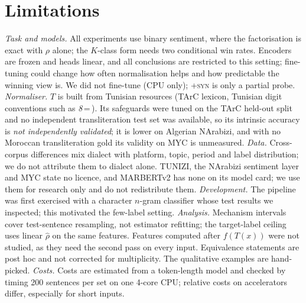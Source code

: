 \section{Limitations}
\label{sec:limitations}
\emph{Task and models.} All experiments use binary sentiment, where the factorisation is exact with $\rho$ alone; the $K$-class form needs two conditional win rates. Encoders are frozen and heads linear, and all conclusions are restricted to this setting; fine-tuning could change how often normalisation helps and how predictable the winning view is. We did not fine-tune (CPU only); \textsc{+syn} is only a partial probe.
\emph{Normaliser.} $T$ is built from Tunisian resources (TArC lexicon, Tunisian digit conventions such as \textit{8}\,=\,). Its safeguards were tuned on the TArC held-out split and no independent transliteration test set was available, so its intrinsic accuracy is \emph{not independently validated}; it is lower on Algerian NArabizi, and with no Moroccan transliteration gold its validity on MYC is unmeasured.
\emph{Data.} Cross-corpus differences mix dialect with platform, topic, period and label distribution; we do not attribute them to dialect alone. TUNIZI, the NArabizi sentiment layer and MYC state no licence, and MARBERTv2 has none on its model card; we use them for research only and do not redistribute them.
\emph{Development.} The pipeline was first exercised with a character $n$-gram classifier whose test results we inspected; this motivated the few-label setting.
\emph{Analysis.} Mechanism intervals cover test-sentence resampling, not estimator refitting; the target-label ceiling uses linear $\hat\rho$ on the same features. Features computed after $f(T(x))$ were not studied, as they need the second pass on every input. Equivalence statements are post hoc and not corrected for multiplicity. The qualitative examples are hand-picked.
\emph{Costs.} Costs are estimated from a token-length model and checked by timing 200 sentences per set on one 4-core CPU; relative costs on accelerators differ, especially for short inputs.
